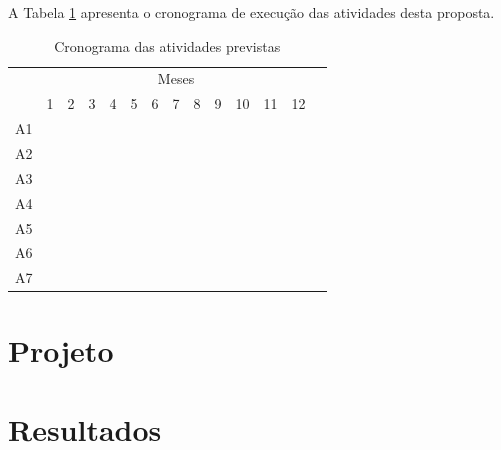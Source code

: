 \lipsum[11-13]

A Tabela \ref{tab_cronograma} apresenta o cronograma de execução das atividades desta proposta.\\

\begin{table}[!htpb]
\centering
\caption{Cronograma das atividades previstas}
\setlength{\tabcolsep}{5pt} 
\begin{tabular}{|c|c|c|c|c|c|c|c|c|c|c|c|c|c|}\hline
 & \multicolumn{12}{c|}{Meses}\\ \cline{2-13}
\raisebox{1.5ex}{Etapa} & 1 & 2 & 3 & 4 & 5 & 6 & 7 & 8 & 9 & 10 & 11 & 12 \\ \hline \hline
A1 & \cellcolor{black} &   &   &   &   &   &   &   &   &   &   &   \\ \hline
A2 &   & \cellcolor{black} &   &   &   &   &   &   &   &   &   &   \\ \hline
A3 &   & \cellcolor{black} & \cellcolor{black} &   &   &   &   &   &   &   &   &   \\ \hline
A4 &   &   &   & \cellcolor{black} & \cellcolor{black} &   &   &   &   &   &   &   \\ \hline
A5 &   &   &   &   &   & \cellcolor{black} & \cellcolor{black} &   &   &   &   &   \\ \hline
A6 &   &   &   &   &   &   &   & \cellcolor{black} & \cellcolor{black} &   &   &   \\ \hline
A7 &   &   &   &   &   &   &   &   &   & \cellcolor{black} & \cellcolor{black} & \cellcolor{black} \\ \hline
\end{tabular} 
\label{tab_cronograma}
\end{table} 



\chapter{Projeto}

\chapter{Resultados} \label{resultados}


